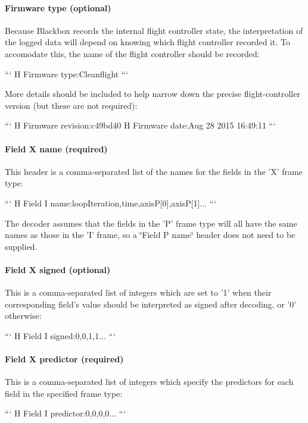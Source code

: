 \paragraph*{Firmware type (optional)}

Because Blackbox records the internal flight controller state, the interpretation of the logged data will depend on knowing which flight controller recorded it. To accomodate this, the name of the flight controller should be recorded\+:

``` H Firmware type\+:Cleanflight ```

More details should be included to help narrow down the precise flight-\/controller version (but these are not required)\+:

``` H Firmware revision\+:c49bd40 H Firmware date\+:Aug 28 2015 16\+:49\+:11 ```

\paragraph*{Field X name (required)}

This header is a comma-\/separated list of the names for the fields in the 'X' frame type\+:

``` H Field I name\+:loop\+Iteration,time,axis\+P\mbox{[}0\mbox{]},axis\+P\mbox{[}1\mbox{]}... ```

The decoder assumes that the fields in the 'P' frame type will all have the same names as those in the 'I' frame, so a \char`\"{}\+Field P name\char`\"{} header does not need to be supplied.

\paragraph*{Field X signed (optional)}

This is a comma-\/separated list of integers which are set to '1' when their corresponding field's value should be interpreted as signed after decoding, or '0' otherwise\+:

``` H Field I signed\+:0,0,1,1... ```

\paragraph*{Field X predictor (required)}

This is a comma-\/separated list of integers which specify the predictors for each field in the specified frame type\+:

``` H Field I predictor\+:0,0,0,0... ```

